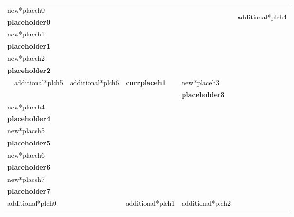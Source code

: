 \documentclass{article}
\begin{document}
\begin{table}[h]
  {\setlength{\tabcolsep}{0.5em}
    \begin{tabularx}{\textwidth}{|Xccll|c|}
      \hline
      \multicolumn{5}{|l|}{new*placeh0} & \multirow{22}{*}{\begin{sideways}additional*plch4\end{sideways}} \\
      \multicolumn{5}{|l|}{\textbf{placeholder0}} & \\
      \multicolumn{5}{|l|}{new*placeh1} & \\
      \multicolumn{5}{|l|}{\textbf{placeholder1}} & \\
      \cline{1-5} \multicolumn{5}{|l|}{new*placeh2} & \\
      \multicolumn{5}{|l|}{\textbf{placeholder2}} & \\
      \cline{2-3} \cline{5-5} & \multicolumn{1}{|l|}{additional*plch5} & \multicolumn{1}{l|}{additional*plch6} & \multicolumn{1}{X|}{\centering \textbf{currplaceh1}} & new*placeh3 & \\
      \cline{2-3} &  &  & \multicolumn{1}{l|}{} & \textbf{placeholder3} & \\
      \cline{1-5} \multicolumn{5}{|l|}{new*placeh4} & \\
      \multicolumn{5}{|l|}{\textbf{placeholder4}} & \\
      \multicolumn{5}{|l|}{new*placeh5} & \\
      \multicolumn{5}{|l|}{\textbf{placeholder5}} & \\
      \multicolumn{5}{|l|}{new*placeh6} & \\
      \multicolumn{5}{|l|}{\textbf{placeholder6}} & \\
      \multicolumn{5}{|l|}{new*placeh7} & \\
      \multicolumn{5}{|l|}{\textbf{placeholder7}} & \\\cline{1-5}
      \multicolumn{3}{|l|}{additional*plch0} & \multicolumn{1}{l|}{additional*plch1} & additional*plch2\hspace{20px} & \\
      \cline{1-5} \multicolumn{3}{|l|}{\multirow{3}{*}{}} & \multicolumn{1}{l|}{\multirow{3}{*}{}} & \multirow{3}{*}{} & \\
      \multicolumn{3}{|l|}{} & \multicolumn{1}{l|}{} &  & \\
      \multicolumn{3}{|l|}{} & \multicolumn{1}{l|}{} &  & \\
      \hline
    \end{tabularx}
  }
\end{table}
\end{document}
